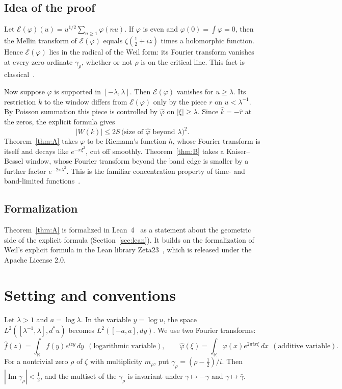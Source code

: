\documentclass[11pt]{amsart}
\theoremstyle{definition}
\theoremstyle{remark}
\numberwithin{equation}{section}
\newcommand{\R}{\mathbb{R}}
\newcommand{\E}{\mathcal{E}}
\begin{document}
\subsection{Idea of the proof}
Let $\E(\varphi)(u)=u^{1/2}\sum_{n\ge1}\varphi(nu)$. If $\varphi$ is even and $\varphi(0)=\int\varphi=0$, then the Mellin transform of $\E(\varphi)$ equals $\zeta(\tfrac12+iz)$ times a holomorphic function. Hence $\E(\varphi)$ lies in the radical of the Weil form: its Fourier transform vanishes at every zero ordinate $\gamma_\rho$, whether or not $\rho$ is on the critical line. This fact is classical~\cite{Connes99,CC21}.

Now suppose $\varphi$ is supported in $[-\lambda,\lambda]$. Then $\E(\varphi)$ vanishes for $u\ge\lambda$. Its restriction $k$ to the window differs from $\E(\varphi)$ only by the piece $r$ on $u<\lambda^{-1}$. By Poisson summation this piece is controlled by $\hat\varphi$ on $|\xi|\ge\lambda$. Since $\hat k=-\hat r$ at the zeros, the explicit formula gives
\[
|W(k)|\le2S\,\big(\text{size of }\hat\varphi\text{ beyond }\lambda\big)^2 .
\]
Theorem~\ref{thm:A} takes $\varphi$ to be Riemann's function $h$, whose Fourier transform is itself and decays like $e^{-\pi\xi^2}$, cut off smoothly. Theorem~\ref{thm:B} takes a Kaiser--Bessel window, whose Fourier transform beyond the band edge is smaller by a further factor $e^{-2\pi\lambda^2}$. This is the familiar concentration property of time- and band-limited functions~\cite{SP61}.

\subsection{Formalization}
Theorem~\ref{thm:A} is formalized in Lean~4~\cite{Lean4,Mathlib} as a statement about the geometric side of the explicit formula (Section~\ref{sec:lean}). It builds on the formalization of Weil's explicit formula in the Lean library Zeta23~\cite{Zeta23}, which is released under the Apache License 2.0.

\section{Setting and conventions}\label{sec:setting}

Let $\lambda>1$ and $a=\log\lambda$. In the variable $y=\log u$, the space $L^2([\lambda^{-1},\lambda],d^*u)$ becomes $L^2([-a,a],dy)$. We use two Fourier transforms:
\[
\hat f(z)=\int_\R f(y)e^{izy}\,dy\ \ (\text{logarithmic variable}),\qquad
\hat\varphi(\xi)=\int_\R\varphi(x)e^{2\pi ix\xi}\,dx\ \ (\text{additive variable}).
\]
For a nontrivial zero $\rho$ of $\zeta$ with multiplicity $m_\rho$, put $\gamma_\rho=(\rho-\tfrac12)/i$. Then $|\operatorname{Im}\gamma_\rho|<\tfrac12$, and the multiset of the $\gamma_\rho$ is invariant under $\gamma\mapsto-\gamma$ and $\gamma\mapsto\bar\gamma$.
\end{document}
